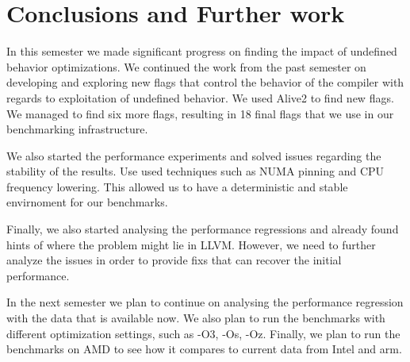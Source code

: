 \section{Conclusions and Further work}

In this semester we made significant progress on finding the impact of undefined
behavior optimizations. We continued the work from the past semester on
developing and exploring new flags that control the behavior of the compiler
with regards to exploitation of undefined behavior. We used Alive2 to find new
flags. We managed to find six more flags, resulting in 18 final flags that we
use in our benchmarking infrastructure.

We also started the performance experiments and solved issues regarding the
stability of the results. Use used techniques such as NUMA pinning and CPU
frequency lowering. This allowed us to have a deterministic and stable
envirnoment for our benchmarks.

Finally, we also started analysing the performance regressions and already found
hints of where the problem might lie in LLVM. However, we need to further analyze
the issues in order to provide fixs that can recover the initial performance.

In the next semester we plan to continue on analysing the performance regression
with the data that is available now. We also plan to run the benchmarks with
different optimization settings, such as -O3, -Os, -Oz. Finally, we plan to run
the benchmarks on AMD to see how it compares to current data from Intel and arm.
